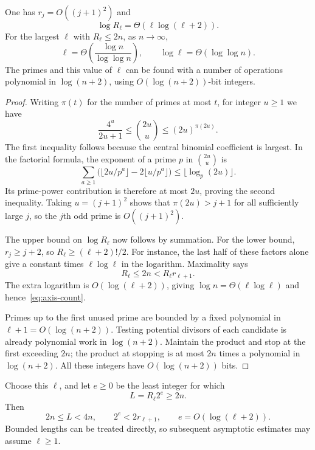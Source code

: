 \begin{lemma}\label{lem:prime-lengths}
One has $r_j=O((j+1)^2)$ and
\[
 \log R_\ell=\Theta(\ell\log(\ell+2)).
\]
For the largest $\ell$ with $R_\ell\le2n$, as $n\to\infty$,
\begin{equation}\label{eq:axis-count}
 \ell=\Theta\!\left(\frac{\log n}{\log\log n}\right),
 \qquad \log\ell=\Theta(\log\log n).
\end{equation}
The primes and this value of $\ell$ can be found with a number of
operations polynomial in $\log(n+2)$, using $O(\log(n+2))$-bit integers.
\end{lemma}
\begin{proof}
Writing $\pi(t)$ for the number of primes at most $t$, for integer $u\ge1$ we have
\begin{equation}\label{eq:binomial-primes}
 \frac{4^u}{2u+1}\le\binom{2u}{u}\le(2u)^{\pi(2u)}.
\end{equation}
The first inequality follows because the central binomial coefficient is largest. In the factorial formula, the exponent of a prime $p$ in $\binom{2u}{u}$ is
\[
 \sum_{a\ge1}\bigl(\lfloor2u/p^a\rfloor-2\lfloor u/p^a\rfloor\bigr)
 \le\lfloor\log_p(2u)\rfloor.
\]
Its prime-power contribution is therefore at most $2u$, proving the second inequality. Taking $u=(j+1)^2$ shows that $\pi(2u)>j+1$ for all sufficiently large $j$, so the $j$th odd prime is $O((j+1)^2)$.

The upper bound on $\log R_\ell$ now follows by summation. For the lower bound, $r_j\ge j+2$, so $R_\ell\ge(\ell+2)!/2$. For instance, the last half of these factors alone give a constant times $\ell\log\ell$ in the logarithm. Maximality says
\[
 R_\ell\le2n<R_\ell r_{\ell+1}.
\]
The extra logarithm is $O(\log(\ell+2))$, giving $\log n=\Theta(\ell\log\ell)$ and hence~\eqref{eq:axis-count}.

Primes up to the first unused prime are bounded by a fixed polynomial in $\ell+1=O(\log(n+2))$. Testing potential divisors of each candidate is already polynomial work in $\log(n+2)$. Maintain the product and stop at the first exceeding $2n$; the product at stopping is at most $2n$ times a polynomial in $\log(n+2)$. All these integers have $O(\log(n+2))$ bits.
\end{proof}

Choose this $\ell$, and let $e\ge0$ be the least integer for which
\begin{equation}\label{eq:working-length}
 L=R_\ell2^e\ge2n.
\end{equation}
Then
\begin{equation}\label{eq:working-bounds}
 2n\le L<4n,\qquad 2^e<2r_{\ell+1},\qquad
 e=O(\log(\ell+2)).
\end{equation}
Bounded lengths can be treated directly, so subsequent asymptotic estimates may assume $\ell\ge1$.

